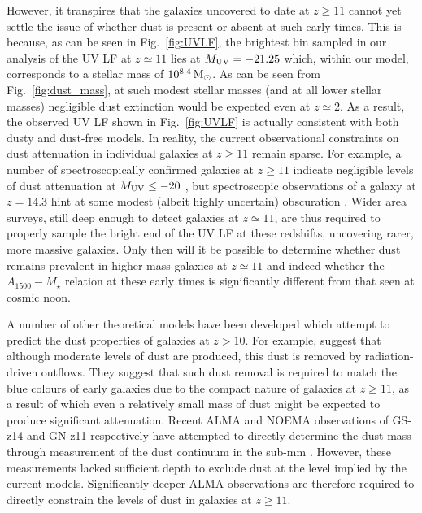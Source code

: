 \documentclass[fleqn,usenatbib]{mnras}
\begin{document}
However, it transpires that the galaxies uncovered to date at $z \geq 11$ cannot yet settle the issue of whether dust is present or absent at such early times. This is because, as can be seen in Fig.~\ref{fig:UVLF}, the brightest bin sampled in our analysis of the UV LF at $z \simeq 11$ lies at $M_{\rm UV}=-21.25$ which, within our model, corresponds to a stellar mass of $10^{8.4}\, \rm M_{\odot}$. As can be seen from Fig.~\ref{fig:dust_mass}, at such modest stellar masses (and at all lower stellar masses) negligible dust extinction would be expected even at $z \simeq 2$. As a result, the observed UV LF shown in Fig.~\ref{fig:UVLF} is actually consistent with both dusty and dust-free models. In reality, the current observational constraints on dust attenuation in individual galaxies at $z\geq11$ remain sparse. For example, a number of spectroscopically confirmed galaxies at $z\geq11$ indicate negligible levels of dust attenuation at $M_{\rm UV}\leq-20$ \citep[e.g.][]{bunker2023,castellano2024}, but spectroscopic observations of a galaxy at $z=14.3$ hint at some modest (albeit highly uncertain) obscuration \citep[$A_{\rm V}\simeq0.3$;][]{carniani2024}. Wider area surveys, still deep enough to detect galaxies at $z \simeq 11$, are thus required to properly sample the bright end of the UV LF at these redshifts, uncovering rarer, more massive galaxies. Only then will it be possible to determine 
whether dust remains prevalent in higher-mass galaxies at $z \simeq 11$ and indeed whether the $A_{1500}-M_{\star}$ relation at these early times is significantly different from that seen at cosmic noon.

A number of other theoretical models have been developed which attempt to predict the dust properties of galaxies at $z>10$. For example, \citet{ferrara2023,ferrara2024} suggest that although moderate levels of dust are produced, this dust is removed by radiation-driven outflows. They suggest that such dust removal is required to match the blue colours of early galaxies due to the compact nature of galaxies at $z\geq11$, as a result of which even a relatively small mass of dust might be expected to produce significant attenuation. Recent ALMA and NOEMA observations of GS-z14 and GN-z11 respectively have attempted to directly determine the dust mass through measurement of the dust continuum in the sub-mm \citep{schouws2024,carniani2024b, fudamoto2024}. However, these measurements lacked sufficient depth to exclude dust at the level implied by the current models. Significantly deeper ALMA observations are therefore required to directly constrain the levels of dust in galaxies at $z\geq11$.
\end{document}
